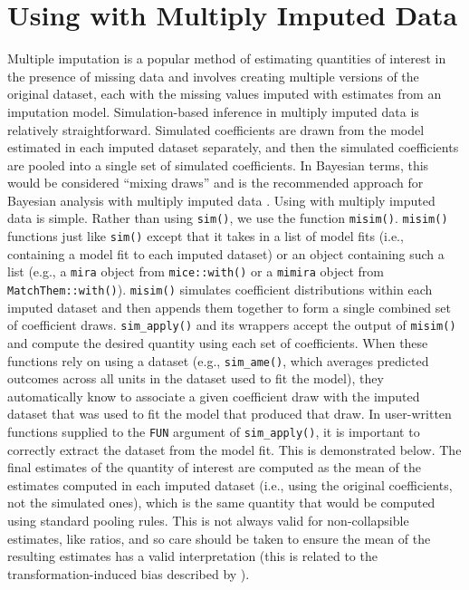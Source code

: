 \section{\texorpdfstring{Using  with Multiply Imputed Data}{Using  with Multiply Imputed Data}}\label{using-with-multiply-imputed-data}
Multiple imputation is a popular method of estimating quantities of interest in the presence of missing data and involves creating multiple versions of the original dataset, each with the missing values imputed with estimates from an imputation model. Simulation-based inference in multiply imputed data is relatively straightforward. Simulated coefficients are drawn from the model estimated in each imputed dataset separately, and then the simulated coefficients are pooled into a single set of simulated coefficients. In Bayesian terms, this would be considered ``mixing draws'' and is the recommended approach for Bayesian analysis with multiply imputed data \citep{zhouNoteBayesianInference2010}.
Using  with multiply imputed data is simple. Rather than using \texttt{sim()}, we use the function \texttt{misim()}. \texttt{misim()} functions just like \texttt{sim()} except that it takes in a list of model fits (i.e., containing a model fit to each imputed dataset) or an object containing such a list (e.g., a \texttt{mira} object from \texttt{mice::with()} or a \texttt{mimira} object from \texttt{MatchThem::with()}). \texttt{misim()} simulates coefficient distributions within each imputed dataset and then appends them together to form a single combined set of coefficient draws.
\texttt{sim\_apply()} and its wrappers accept the output of \texttt{misim()} and compute the desired quantity using each set of coefficients. When these functions rely on using a dataset (e.g., \texttt{sim\_ame()}, which averages predicted outcomes across all units in the dataset used to fit the model), they automatically know to associate a given coefficient draw with the imputed dataset that was used to fit the model that produced that draw. In user-written functions supplied to the \texttt{FUN} argument of \texttt{sim\_apply()}, it is important to correctly extract the dataset from the model fit. This is demonstrated below.
The final estimates of the quantity of interest are computed as the mean of the estimates computed in each imputed dataset (i.e., using the original coefficients, not the simulated ones), which is the same quantity that would be computed using standard pooling rules. This is not always valid for non-collapsible estimates, like ratios, and so care should be taken to ensure the mean of the resulting estimates has a valid interpretation (this is related to the transformation-induced bias described by \citet{rainey2017}).
